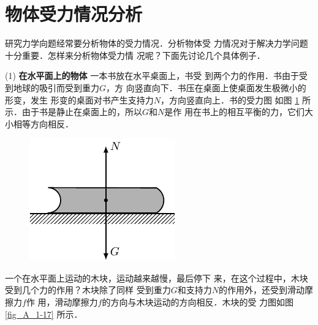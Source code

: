 \section{物体受力情况分析} 
    研究力学向题经常要分析物体的受力情况．分析物体受
力情况对于解决力学问题十分重要．怎样来分析物体受力情
况呢？下面先讨论几个具体例子．

    (1) \textbf{在水平面上的物体 }  一本书放在水平桌面上，书受
到两个力的作用．书由于受到地球的吸引而受到重力$G$，方
向竖直向下．书压在桌面上使桌面发生极微小的形变，发生
形变的桌面对书产生支持力$N$，方向竖直向上．书的受力图
如图 \ref{fig_A_1-16} 所示．由于书是静止在桌面上的，所以$G$和$N$是作
用在书上的相互平衡的力，它们大小相等方向相反．
\begin{figure} [htp]\centering
\includegraphics{fig/A/1-16.pdf} 
\caption{} \label{fig_A_1-16} 
\end{figure} 

    一个在水平面上运动的木块，运动越来越慢，最后停下
来，在这个过程中，木块受到几个力的作用？木块除了同样
受到重力$G$和支持力$N$的作用外，还受到滑动摩擦力$f$作
用，滑动摩擦力$f$的方向与木块运动的方向相反．木块的受
力图如图 \ref{fig_A_1-17} 所示．

